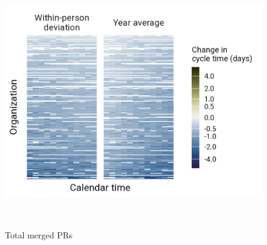 \documentclass[manuscript,screen,review]{acmart}
\begin{document}
\begin{figure}
\begin{minipage}{0.33\linewidth}
{\includegraphics{plots/total_merged_prs_eff_size.png}

}

\subcaption{\label{fig-heatmaps-prs}}

\end{minipage}%
\newline
\begin{minipage}{0.17\linewidth}
~\end{minipage}%
%
\begin{minipage}{0.33\linewidth}
Total merged PRs\end{minipage}%
%
\begin{minipage}{0.33\linewidth}

\end{minipage}
\end{figure}
\end{document}
